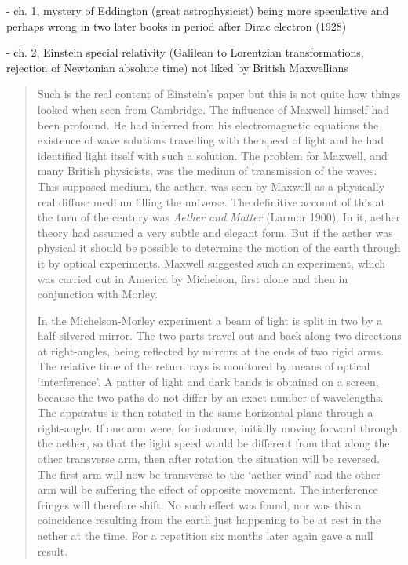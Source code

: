 - ch. 1, mystery of Eddington (great astrophysicist) being more speculative and perhaps wrong in two later books in period after Dirac electron (1928)

- ch. 2, Einstein special relativity (Galilean to Lorentzian transformations, rejection of Newtonian absolute time) not liked by British Maxwellians

\begin{quote}
    Such is the real content of Einstein's paper but this is not quite how things looked when seen from Cambridge.  The influence of Maxwell himself had been profound.  He had inferred from his electromagnetic equations the existence of wave solutions travelling with the speed of light and he had identified light itself with such a solution.  The problem for Maxwell, and many British physicists, was the medium of transmission of the waves.  This supposed medium, the aether, was seen by Maxwell as a physically real diffuse medium filling the universe.  The definitive account of this at the turn of the century was \emph{Aether and Matter} (Larmor 1900).  In it, aether theory had assumed a very subtle and elegant form.  But if the aether was physical it should be possible to determine the motion of the earth through it by optical experiments.  Maxwell suggested such an experiment, which was carried out in America by Michelson, first alone and then in conjunction with Morley.  
    
    In the Michelson-Morley experiment a beam of light is split in two by a half-silvered mirror.  The two parts travel out and back along two directions at right-angles, being reflected by mirrors at the ends of two rigid arms.  The relative time of the return rays is monitored by means of optical `interference'.  A patter of light and dark bands is obtained on a screen, because the two paths do not differ by an exact number of wavelengths.  The apparatus is then rotated in the same horizontal plane through a right-angle.  If one arm were, for instance, initially moving forward through the aether, so that the light speed would be different from that along the other transverse arm, then after rotation the situation will be reversed.  The first arm will now be transverse to the `aether wind' and the other arm will be suffering the effect of opposite movement.  The interference fringes will therefore shift.  No such effect was found, nor was this a coincidence resulting from the earth just happening to be at rest in the aether at the time.  For a repetition six months later again gave a null result.
    

\end{quote}
